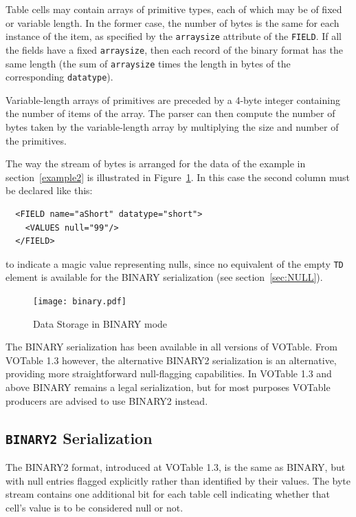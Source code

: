 \documentclass[11pt,a4paper]{ivoa}
\def\Aref#1{section~\ref{#1}}
\def\Fref#1{Figure~\ref{#1}}
\let\fg=\color
\def\attr#1{{\tt{\fg{DarkRed}#1}}}
\def\elem#1{{\tt{\fg{DarkRed}#1}}}
\begin{document}
{Table cells may contain arrays of primitive types, each of which
may be of fixed or variable length. In the former case, the number of
bytes is the same for each instance of the item, as specified by the
{\attr{arraysize}}
attribute of the {\elem{FIELD}}.
If all the fields have a fixed {\attr{arraysize}},
then each record of the binary format has the same length
(the sum of {\attr{arraysize}}
times the length in bytes of the corresponding {\attr{datatype}}).

Variable-length arrays of primitives are preceded by a 4-byte integer
containing the number of items of the array.
The parser can then compute the number of bytes taken
by the variable-length array by multiplying the size and number
of the primitives.

The way the stream of bytes is arranged for the data of the
example in \Aref{example2} is illustrated in
\Fref{fig:bin}.
In this case the second column must be declared like this:
\begin{verbatim}
  <FIELD name="aShort" datatype="short">
    <VALUES null="99"/>
  </FIELD>
\end{verbatim}
to indicate a magic value representing nulls, since no equivalent of the
empty \elem{TD} element is available for the BINARY serialization
(see \Aref{sec:NULL}).

\label{Image2}
\begin{center}
\begin{figure}[htb]
\texttt{[image: binary.pdf]}
\caption{\label{fig:bin}Data Storage in BINARY mode}
\end{figure}\end{center}

The BINARY serialization has been available in all versions of VOTable.
From VOTable 1.3 however, the alternative BINARY2 serialization is
an alternative, providing more straightforward null-flagging capabilities.
In VOTable 1.3 and above BINARY remains a legal serialization, but for most
purposes VOTable producers are advised to use BINARY2 instead.

\subsection{\elem{BINARY2} Serialization}
\label{sec:BIN2}

The BINARY2 format, introduced at VOTable 1.3, is the same as BINARY,
but with null entries flagged explicitly rather than identified
by their values.
The byte stream contains one additional bit for each table cell
indicating whether that cell's value is to be considered null or not.

}
\end{document}
